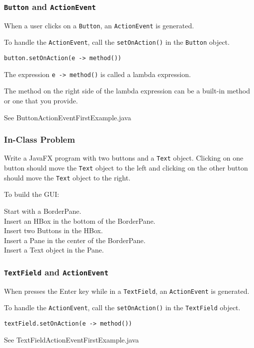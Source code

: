 \documentclass{beamer}
\newcommand{\mil}[1]{\texttt{#1}}
\begin{document}
\begin{frame}[fragile]

	\frametitle{\mil{Button} and \mil{ActionEvent}}
	
    When a user clicks on a \mil{Button}, an \mil{ActionEvent} is generated.
    
    \bigskip
    
    To handle the \mil{ActionEvent}, call the \mil{setOnAction()} in the \mil{Button} object. 
    
    \bigskip
    
    \mil{button.setOnAction(e -> method())}
    
    \bigskip
    
    The expression \mil{e -> method()} is called a lambda expression.
    
    \bigskip
    
    The method on the right side of the lambda expression can be a built-in method or one that you provide.
    
    \bigskip
    
    See ButtonActionEventFirstExample.java
	
\end{frame}

\begin{frame}

    \frametitle{In-Class Problem}
    
Write a JavaFX program with two buttons and a \mil{Text} object.  Clicking on one button should move the \mil{Text} object to the left and clicking on the other button should move the \mil{Text} object to the right.

\bigskip

To build the GUI:

\bigskip

Start with a BorderPane.\\
Insert an HBox in the bottom of the BorderPane.\\
Insert two Buttons in the HBox.\\
Insert a Pane in the center of the BorderPane.\\
Insert a Text object in the Pane.    
\end{frame}

\begin{frame}[fragile]

	\frametitle{\mil{TextField} and \mil{ActionEvent}}
	
    When presses the Enter key while in a \mil{TextField}, an \mil{ActionEvent} is generated.
    
    \bigskip
    
    To handle the \mil{ActionEvent}, call the \mil{setOnAction()} in the \mil{TextField} object. 
    
    \bigskip
    
    \mil{textField.setOnAction(e -> method())}
    
    
    \bigskip
    
    See TextFieldActionEventFirstExample.java
	
\end{frame}
\end{document}
